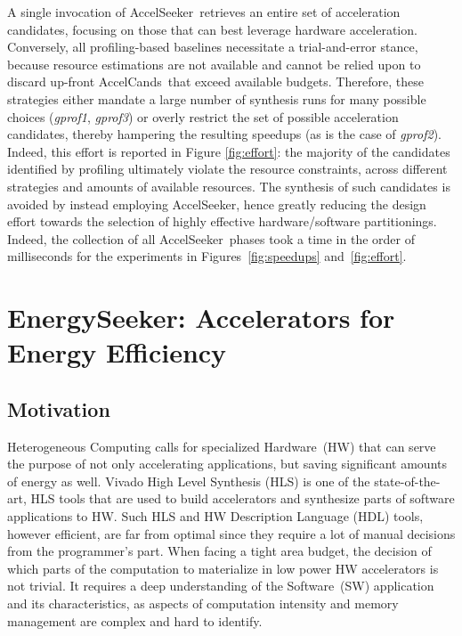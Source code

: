 \documentclass[]{usiinfthesis}
\newcommand{\aseeker}{{AccelSeeker}}
\newcommand{\HW}{{Hardware}}
\newcommand{\SW}{{Software}}
\newcommand{\candidates}{{AccelCand}s}
\begin{document}
A single invocation of \aseeker\ retrieves an entire set of
acceleration candidates, focusing on those that can best leverage
hardware acceleration.  Conversely, all profiling-based baselines
necessitate a trial-and-error stance, because resource estimations are
not available and cannot be relied upon to discard up-front
\candidates\ that exceed available budgets.  Therefore, these
strategies either mandate a large number of synthesis runs for many
possible choices (\emph{gprof1}, \emph{gprof3}) or overly restrict the
set of possible acceleration candidates, thereby hampering the
resulting speedups (as is the case of \emph{gprof2}).  Indeed, this
effort is reported in Figure \ref{fig:effort}: the majority of the
candidates identified by profiling ultimately violate the resource
constraints, across different strategies and amounts of available
resources. The synthesis of such candidates is avoided by instead
employing \aseeker, hence greatly reducing the design effort towards
the selection of highly effective hardware/software partitionings.
Indeed, the collection of all \aseeker\ phases took a time in the
order of milliseconds for the experiments in
Figures~\ref{fig:speedups} and~\ref{fig:effort}.

% 
%
%
%
%

\section{EnergySeeker: Accelerators for Energy Efficiency}

\subsection{Motivation}

Heterogeneous Computing calls for specialized \HW\ (HW) that can serve the purpose of
not only accelerating applications, but saving significant amounts of energy as well.
Vivado High Level Synthesis (HLS) 
\cite{VivadoHLSMar17} is one of the state-of-the-art, HLS tools that are used to 
build accelerators and synthesize parts of software applications to HW. Such HLS 
and HW Description Language (HDL) tools, however efficient, are far from optimal 
since they require a lot of manual decisions from the programmer's part. When 
facing a tight area budget, the decision of which parts of the computation to 
 materialize in low power HW accelerators is not 
trivial. It requires a deep understanding of the \SW\ (SW) application 
and its characteristics, as aspects of computation intensity and memory 
management are complex and hard to identify.\par
\end{document}
